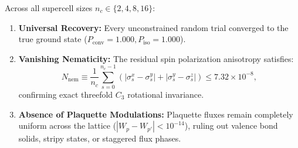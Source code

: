 \begin{proposition}
\label{thm:m1_7_stability}
Across all supercell sizes $n_c \in \{2, 4, 8, 16\}$:
\begin{enumerate}
\item \textbf{Universal Recovery:} Every unconstrained random trial converged to the true ground state ($P_{\mathrm{conv}} = 1.000, P_{\mathrm{iso}} = 1.000$).
\item \textbf{Vanishing Nematicity:} The residual spin polarization anisotropy satisfies:
\begin{equation}
N_{\mathrm{nem}} \equiv \frac{1}{n_c} \sum_{s=0}^{n_c-1} \left( |\sigma_s^x - \sigma_s^y| + |\sigma_s^y - \sigma_s^z| \right) \le 7.32 \times 10^{-8},
\end{equation}
confirming exact threefold $C_3$ rotational invariance.
\item \textbf{Absence of Plaquette Modulations:} Plaquette fluxes remain completely uniform across the lattice ($|W_p - W_{p'}| < 10^{-14}$), ruling out valence bond solids, stripy states, or staggered flux phases.
\end{enumerate}
\end{proposition}
